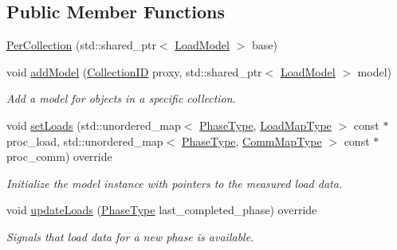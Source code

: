 \subsection*{Public Member Functions}
\begin{DoxyCompactItemize}
\item 
\hyperlink{structvt_1_1vrt_1_1collection_1_1balance_1_1_per_collection_aa149a252fec1619bd947e53e3a66b854}{Per\+Collection} (std\+::shared\+\_\+ptr$<$ \hyperlink{structvt_1_1vrt_1_1collection_1_1balance_1_1_load_model}{Load\+Model} $>$ base)
\item 
void \hyperlink{structvt_1_1vrt_1_1collection_1_1balance_1_1_per_collection_a79ecd769664dcaabe413a5d77033b81b}{add\+Model} (\hyperlink{structvt_1_1vrt_1_1collection_1_1balance_1_1_per_collection_ade08a6857f727a0a9d1ef63b25fc5b71}{Collection\+ID} proxy, std\+::shared\+\_\+ptr$<$ \hyperlink{structvt_1_1vrt_1_1collection_1_1balance_1_1_load_model}{Load\+Model} $>$ model)
\begin{DoxyCompactList}\small\item\em Add a model for objects in a specific collection. \end{DoxyCompactList}\item 
void \hyperlink{structvt_1_1vrt_1_1collection_1_1balance_1_1_per_collection_aba8f472fbe40c44c9f0f9028afe29cfc}{set\+Loads} (std\+::unordered\+\_\+map$<$ \hyperlink{namespacevt_a46ce6733d5cdbd735d561b7b4029f6d7}{Phase\+Type}, \hyperlink{namespacevt_1_1vrt_1_1collection_1_1balance_a5339303db2e1ce964d783a53fd74e6b1}{Load\+Map\+Type} $>$ const $\ast$proc\+\_\+load, std\+::unordered\+\_\+map$<$ \hyperlink{namespacevt_a46ce6733d5cdbd735d561b7b4029f6d7}{Phase\+Type}, \hyperlink{namespacevt_1_1vrt_1_1collection_1_1balance_a10860c956804d644db54a16012352728}{Comm\+Map\+Type} $>$ const $\ast$proc\+\_\+comm) override
\begin{DoxyCompactList}\small\item\em Initialize the model instance with pointers to the measured load data. \end{DoxyCompactList}\item 
void \hyperlink{structvt_1_1vrt_1_1collection_1_1balance_1_1_per_collection_a2b41fbbe2b684654f8dbfd9207b77501}{update\+Loads} (\hyperlink{namespacevt_a46ce6733d5cdbd735d561b7b4029f6d7}{Phase\+Type} last\+\_\+completed\+\_\+phase) override
\begin{DoxyCompactList}\small\item\em Signals that load data for a new phase is available. \end{DoxyCompactList}\item 

\end{DoxyCompactItemize}
